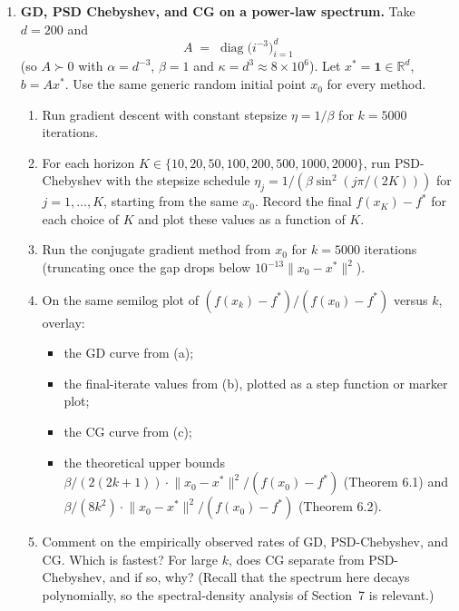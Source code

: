 \documentclass[11pt]{article}
\newcommand{\R}{\mathbb{R}}
\newcommand{\bstar}{f^\ast}
\newcommand{\xstar}{x^\ast}
\newcommand{\norm}[1]{\lVert #1\rVert}
\begin{document}
\begin{enumerate}[label=\textbf{E\arabic*.}, leftmargin=0pt, itemindent=2.5em]

\item \textbf{GD, PSD Chebyshev, and CG on a power-law spectrum.}
Take $d=200$ and
\[
A \;=\; \operatorname{diag}\bigl(i^{-3}\bigr)_{i=1}^d
\]
(so $A\succ 0$ with $\alpha=d^{-3}$, $\beta=1$ and $\kappa=d^3\approx 8\times 10^6$). Let $\xstar=\mathbf{1}\in\R^d$, $b=A\xstar$. Use the same generic random initial point $x_0$ for every method.

\begin{enumerate}[label=(\alph*)]
\item Run gradient descent with constant stepsize $\eta=1/\beta$ for $k=5000$ iterations.

\item For each horizon $K\in\{10,20,50,100,200,500,1000,2000\}$, run PSD-Chebyshev with the stepsize schedule $\eta_j = 1/(\beta\sin^2(j\pi/(2K)))$ for $j=1,\dots,K$, starting from the same $x_0$. Record the final $f(x_K)-\bstar$ for each choice of $K$ and plot these values as a function of $K$.

\item Run the conjugate gradient method from $x_0$ for $k=5000$ iterations (truncating once the gap drops below $10^{-13}\norm{x_0-\xstar}^2$).

\item On the same semilog plot of $(f(x_k)-\bstar)/(f(x_0)-\bstar)$ versus $k$, overlay:
\begin{itemize}
\item the GD curve from (a);
\item the final-iterate values from (b), plotted as a step function or marker plot;
\item the CG curve from (c);
\item the theoretical upper bounds $\beta/(2(2k+1))\cdot \norm{x_0-\xstar}^2/(f(x_0)-\bstar)$ (Theorem 6.1) and $\beta/(8k^2)\cdot \norm{x_0-\xstar}^2/(f(x_0)-\bstar)$ (Theorem 6.2).
\end{itemize}

\item Comment on the empirically observed rates of GD, PSD-Chebyshev, and CG. Which is fastest? For large $k$, does CG separate from PSD-Chebyshev, and if so, why? (Recall that the spectrum here decays polynomially, so the spectral-density analysis of Section~7 is relevant.)
\end{enumerate}


\end{enumerate}
\end{document}

